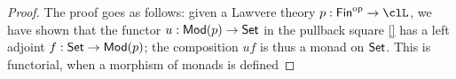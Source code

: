 \begin{proof}
	The proof goes as follows: given a Lawvere theory $p : \textsf{Fin}^\op \to \clL$, we have shown that the functor $u : \mathsf{Mod}(p) \to \mathsf{Set}$ in the pullback square \autoref{} has a left adjoint $f : \mathsf{Set} \to \mathsf{Mod}(p)$; the composition $uf$ is thus a monad on $\mathsf{Set}$. This is functorial, when a morphism of monads is defined
\end{proof}
